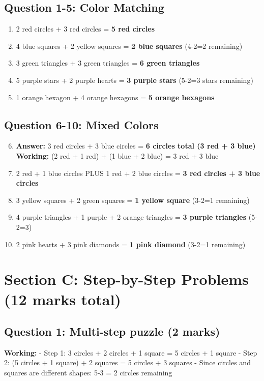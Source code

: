 \documentclass{article}
\begin{document}
\subsection*{Question 1-5: Color Matching}
\begin{enumerate}
    \item 2 red circles + 3 red circles = \textbf{5 red circles}
    \item 4 blue squares + 2 yellow squares = \textbf{2 blue squares} (4-2=2 remaining)
    \item 3 green triangles + 3 green triangles = \textbf{6 green triangles}
    \item 5 purple stars + 2 purple hearts = \textbf{3 purple stars} (5-2=3 stars remaining)
    \item 1 orange hexagon + 4 orange hexagons = \textbf{5 orange hexagons}
\end{enumerate}

\subsection*{Question 6-10: Mixed Colors}
\begin{enumerate}
    \setcounter{enumi}{5}
    \item \textbf{Answer:} 3 red circles + 3 blue circles = \textbf{6 circles total (3 red + 3 blue)}
          \textbf{Working:} (2 red + 1 red) + (1 blue + 2 blue) = 3 red + 3 blue
    \item 2 red + 1 blue circles PLUS 1 red + 2 blue circles = \textbf{3 red circles + 3 blue circles}
    \item 3 yellow squares + 2 green squares = \textbf{1 yellow square} (3-2=1 remaining)
    \item 4 purple triangles + 1 purple + 2 orange triangles = \textbf{3 purple triangles} (5-2=3)
    \item 2 pink hearts + 3 pink diamonds = \textbf{1 pink diamond} (3-2=1 remaining)
\end{enumerate}

\section{Section C: Step-by-Step Problems (12 marks total)}

\subsection*{Question 1: Multi-step puzzle (2 marks)}
\textbf{Working:}
- Step 1: 3 circles + 2 circles + 1 square = 5 circles + 1 square
- Step 2: (5 circles + 1 square) + 2 squares = 5 circles + 3 squares  
- Since circles and squares are different shapes: 5-3 = 2 circles remaining
\end{document}
